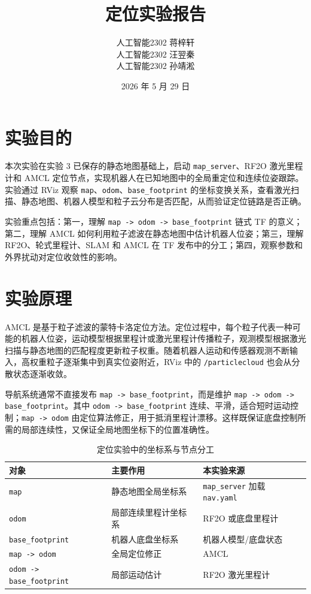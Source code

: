 \documentclass[11pt,a4paper,fontset=fandol]{ctexart}
\title{\bfseries 定位实验报告}
\author{人工智能2302 \quad 蒋梓轩\\
人工智能2302 \quad 汪翌秦\\
人工智能2302 \quad 孙靖淞}
\date{2026 年 5 月 29 日}
\begin{document}
\maketitle

\section{实验目的}

本次实验在实验 3 已保存的静态地图基础上，启动 \verb|map_server|、RF2O 激光里程计和 AMCL 定位节点，实现机器人在已知地图中的全局重定位和连续位姿跟踪。实验通过 RViz 观察 \verb|map|、\verb|odom|、\verb|base_footprint| 的坐标变换关系，查看激光扫描、静态地图、机器人模型和粒子云分布是否匹配，从而验证定位链路是否正确。

实验重点包括：第一，理解 \verb|map -> odom -> base_footprint| 链式 TF 的意义；第二，理解 AMCL 如何利用粒子滤波在静态地图中估计机器人位姿；第三，理解 RF2O、轮式里程计、SLAM 和 AMCL 在 TF 发布中的分工；第四，观察参数和外界扰动对定位收敛性的影响。

\section{实验原理}

AMCL 是基于粒子滤波的蒙特卡洛定位方法。定位过程中，每个粒子代表一种可能的机器人位姿，运动模型根据里程计或激光里程计传播粒子，观测模型根据激光扫描与静态地图的匹配程度更新粒子权重。随着机器人运动和传感器观测不断输入，高权重粒子逐渐集中到真实位姿附近，RViz 中的 \verb|/particlecloud| 也会从分散状态逐渐收敛。

导航系统通常不直接发布 \verb|map -> base_footprint|，而是维护 \verb|map -> odom -> base_footprint|。其中 \verb|odom -> base_footprint| 连续、平滑，适合短时运动控制；\verb|map -> odom| 由定位算法修正，用于抵消里程计漂移。这样既保证底盘控制所需的局部连续性，又保证全局地图坐标下的位置准确性。

\begin{table}[H]
  \centering
  \caption{定位实验中的坐标系与节点分工}
  \begin{tabular}{lll}
    \toprule
    对象 & 主要作用 & 本实验来源 \\
    \midrule
    \verb|map| & 静态地图全局坐标系 & \verb|map_server| 加载 \verb|nav.yaml| \\
    \verb|odom| & 局部连续里程计坐标系 & RF2O 或底盘里程计 \\
    \verb|base_footprint| & 机器人底盘坐标系 & 机器人模型/底盘状态 \\
    \verb|map -> odom| & 全局定位修正 & AMCL \\
    \verb|odom -> base_footprint| & 局部运动估计 & RF2O 激光里程计 \\
    \bottomrule
  \end{tabular}
\end{table}
\end{document}
